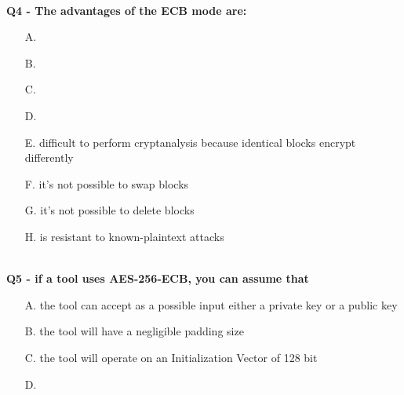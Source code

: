 \textbf{\\Q4 - The advantages of the ECB mode are:}
\begin{enumerate}
    \item[A.] 
    \item[B.] 
    \item[C.] 
    \item[D.] 
    \item[E.] difficult to perform cryptanalysis because identical blocks encrypt differently
    \item[F.] it’s not possible to swap blocks
    \item[G.] it’s not possible to delete blocks
    \item[H.] is resistant to known-plaintext attacks
\end{enumerate}


\textbf{\\Q5 - if a tool uses AES-256-ECB, you can assume that}
\begin{enumerate}
    \item[A.] the tool can accept as a possible input either a private key or a public key
    \item[B.] the tool will have a negligible padding size
    \item[C.] the tool will operate on an Initialization Vector of 128 bit
    \item[D.] 
\end{enumerate}


